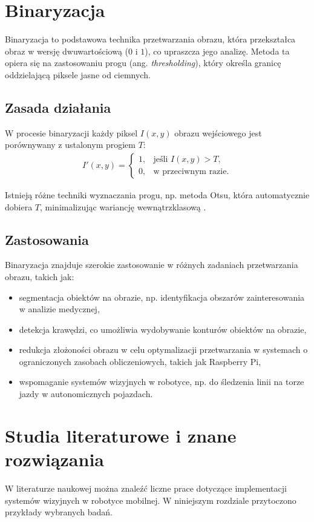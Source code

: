 \documentclass[a4paper,twoside,12pt]{book}
\begin{document}
\section{Binaryzacja}
Binaryzacja to podstawowa technika przetwarzania obrazu, która przekształca obraz w wersję dwuwartościową (\(0\) i \(1\)), co upraszcza jego analizę. Metoda ta opiera się na zastosowaniu progu (ang. \textit{thresholding}), który określa granicę oddzielającą piksele jasne od ciemnych.

\subsection{Zasada działania}
W procesie binaryzacji każdy piksel \( I(x, y) \) obrazu wejściowego jest porównywany z ustalonym progiem \( T \):
\begin{align}
    I'(x, y) =
    \begin{cases} 
        1, & \text{jeśli } I(x, y) > T, \\
        0, & \text{w przeciwnym razie}.
    \end{cases}
\end{align}

Istnieją różne techniki wyznaczania progu, np. metoda Otsu, która automatycznie dobiera \( T \), minimalizując wariancję wewnątrzklasową \cite{bib:huang2012improved}.
\subsection{Zastosowania}
Binaryzacja znajduje szerokie zastosowanie w różnych zadaniach przetwarzania obrazu, takich jak:
\begin{itemize}
    \item segmentacja obiektów na obrazie, np. identyfikacja obszarów zainteresowania w analizie medycznej,
    \item detekcja krawędzi, co umożliwia wydobywanie konturów obiektów na obrazie,
    \item redukcja złożoności obrazu w celu optymalizacji przetwarzania w systemach o ograniczonych zasobach obliczeniowych, takich jak Raspberry Pi,
    \item wspomaganie systemów wizyjnych w robotyce, np. do śledzenia linii na torze jazdy w autonomicznych pojazdach.
\end{itemize}
\newpage
\section{Studia literaturowe i znane rozwiązania}
W literaturze naukowej można znaleźć liczne prace dotyczące implementacji systemów wizyjnych w robotyce mobilnej. W niniejszym rozdziale przytoczono przykłady wybranych badań.
\end{document}
